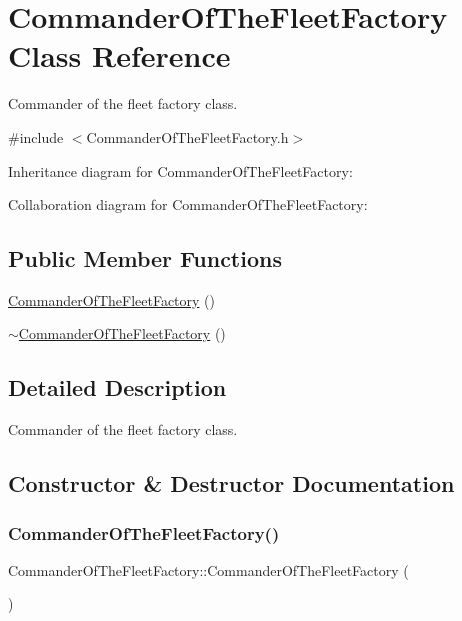 \hypertarget{classCommanderOfTheFleetFactory}{}\section{Commander\+Of\+The\+Fleet\+Factory Class Reference}
\label{classCommanderOfTheFleetFactory}


Commander of the fleet factory class.  




{\ttfamily \#include $<$Commander\+Of\+The\+Fleet\+Factory.\+h$>$}



Inheritance diagram for Commander\+Of\+The\+Fleet\+Factory\+:


Collaboration diagram for Commander\+Of\+The\+Fleet\+Factory\+:
\subsection*{Public Member Functions}
\begin{DoxyCompactItemize}
\item 
\hyperlink{classCommanderOfTheFleetFactory_a8a5df50232cc48a885ba2a05928a8301}{Commander\+Of\+The\+Fleet\+Factory} ()
\item 
\hyperlink{classCommanderOfTheFleetFactory_ad6a8e81a67057ce5d65c47289cd7b4f4}{$\sim$\+Commander\+Of\+The\+Fleet\+Factory} ()
\end{DoxyCompactItemize}


\subsection{Detailed Description}
Commander of the fleet factory class. 

\subsection{Constructor \& Destructor Documentation}
\mbox{\label{classCommanderOfTheFleetFactory_a8a5df50232cc48a885ba2a05928a8301}} 
\subsubsection{\texorpdfstring{Commander\+Of\+The\+Fleet\+Factory()}{CommanderOfTheFleetFactory()}}
{\footnotesize\ttfamily Commander\+Of\+The\+Fleet\+Factory\+::\+Commander\+Of\+The\+Fleet\+Factory (\begin{DoxyParamCaption}{ }\end{DoxyParamCaption})}

